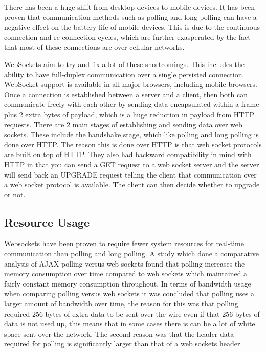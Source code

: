 There has been a huge shift from desktop devices to mobile devices\cite{6365155}. It has been proven that communication methods such as polling and long polling can have a negative effect on the battery life of mobile devices\cite{6364271}. This is due to the continuous connection and re-connection cycles, which are further exasperated by the fact that most of these connections are over cellular networks.

WebSockets aim to try and fix a lot of these shortcomings. This includes the ability to have full-duplex communication over a single persisted connection. WebSocket support is available in all major browsers, including mobile browsers. Once a connection is established between a server and a client, then both can communicate freely with each other by sending data encapsulated within a frame plus 2 extra bytes of payload, which is a huge reduction in payload from HTTP requests. There are 2 main stages of establishing and sending data over web sockets. These include the handshake stage, which like polling and long polling is done over HTTP. The reason this is done over HTTP is that web socket protocols are built on top of HTTP. They also had backward compatibility in mind with HTTP in that you can send a GET request to a web socket server and the server will send back an UPGRADE request telling the client that communication over a web socket protocol is available. The client can then decide whether to upgrade or not.

\subsection{Resource Usage}

Websockets have been proven to require fewer system resources for real-time communication than polling and long polling. A study which done a comparative analysis of AJAX polling versus web sockets found that polling increases the memory consumption over time compared to web sockets which maintained a fairly constant memory consumption throughout\cite{6601579}. In terms of bandwidth usage when comparing polling versus web sockets it was concluded that polling uses a larger amount of bandwidth over time, the reason for this was that polling required 256 bytes of extra data to be sent over the wire even if that 256 bytes of data is not used up, this means that in some cases there is can be a lot of white space sent over the network. The second reason was that the header data required for polling is significantly larger than that of a web sockets header\cite{6601579}.

